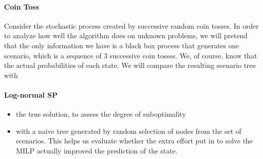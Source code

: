 \paragraph{Coin Toss} Consider the stochastic process created by successive random coin tosses.
In order to analyze how well the algorithm does on unknown problems, we will pretend that the only information we have is a black box process that generates one scenario, which is a sequence of 3 successive coin tosses.
We, of course, know that the actual probabilities of each state.
We will compare the resulting scenario tree with
\paragraph{Log-normal SP}

\begin{itemize}
\item the true solution, to assess the degree of suboptimality
\item with a naive tree generated by random selection of nodes from the set of scenarios. This helps us evaluate whether the extra effort put in to solve the MILP actually improved the prediction of the state.
\end{itemize}


